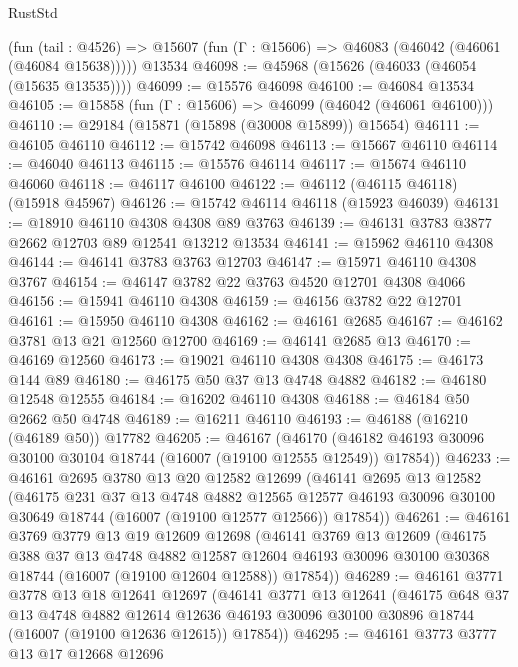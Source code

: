 \begin{lexlean}{RustStd}
\begin{coremodule}
    (fun (tail : @4526) => @15607 (fun (Γ : @15606) => @46083 (@46042 (@46061 (@46084 @15638)))))
    @13534
@46098 := @45968 (@15626 (@46033 (@46054 (@15635 @13535))))
@46099 := @15576 @46098
@46100 := @46084 @13534
@46105 := @15858 (fun (Γ : @15606) => @46099 (@46042 (@46061 @46100)))
@46110 := @29184 (@15871 (@15898 (@30008 @15899)) @15654)
@46111 := @46105 @46110
@46112 := @15742 @46098
@46113 := @15667 @46110
@46114 := @46040 @46113
@46115 := @15576 @46114
@46117 := @15674 @46110 @46060
@46118 := @46117 @46100
@46122 := @46112 (@46115 @46118) (@15918 @45967)
@46126 := @15742 @46114 @46118 (@15923 @46039)
@46131 := @18910 @46110 @4308 @4308 @89 @3763
@46139 := @46131 @3783 @3877 @2662 @12703 @89 @12541 @13212 @13534
@46141 := @15962 @46110 @4308
@46144 := @46141 @3783 @3763 @12703
@46147 := @15971 @46110 @4308 @3767
@46154 := @46147 @3782 @22 @3763 @4520 @12701 @4308 @4066
@46156 := @15941 @46110 @4308
@46159 := @46156 @3782 @22 @12701
@46161 := @15950 @46110 @4308
@46162 := @46161 @2685
@46167 := @46162 @3781 @13 @21 @12560 @12700
@46169 := @46141 @2685 @13
@46170 := @46169 @12560
@46173 := @19021 @46110 @4308 @4308
@46175 := @46173 @144 @89
@46180 := @46175 @50 @37 @13 @4748 @4882
@46182 := @46180 @12548 @12555
@46184 := @16202 @46110 @4308
@46188 := @46184 @50 @2662 @50 @4748
@46189 := @16211 @46110
@46193 := @46188 (@16210 (@46189 @50)) @17782
@46205 := @46167
    (@46170 (@46182 @46193 @30096 @30100 @30104 @18744 (@16007 (@19100 @12555 @12549)) @17854))
@46233 := @46161
    @2695
    @3780
    @13
    @20
    @12582
    @12699
    (@46141
      @2695
      @13
      @12582
      (@46175
        @231
        @37
        @13
        @4748
        @4882
        @12565
        @12577
        @46193
        @30096
        @30100
        @30649
        @18744
        (@16007 (@19100 @12577 @12566))
        @17854))
@46261 := @46161
    @3769
    @3779
    @13
    @19
    @12609
    @12698
    (@46141
      @3769
      @13
      @12609
      (@46175
        @388
        @37
        @13
        @4748
        @4882
        @12587
        @12604
        @46193
        @30096
        @30100
        @30368
        @18744
        (@16007 (@19100 @12604 @12588))
        @17854))
@46289 := @46161
    @3771
    @3778
    @13
    @18
    @12641
    @12697
    (@46141
      @3771
      @13
      @12641
      (@46175
        @648
        @37
        @13
        @4748
        @4882
        @12614
        @12636
        @46193
        @30096
        @30100
        @30896
        @18744
        (@16007 (@19100 @12636 @12615))
        @17854))
@46295 := @46161 @3773 @3777 @13 @17 @12668 @12696

\end{coremodule}
\end{lexlean}
